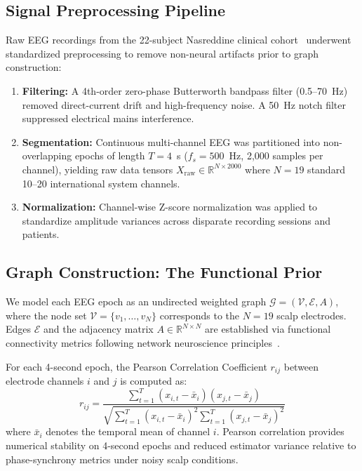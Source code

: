 \documentclass[journal]{IEEEtran}
\begin{document}
\subsection{Signal Preprocessing Pipeline}
Raw EEG recordings from the 22-subject Nasreddine clinical cohort~\cite{nasreddine} underwent standardized preprocessing to remove non-neural artifacts prior to graph construction:
\begin{enumerate}
    \item \textbf{Filtering:} A 4th-order zero-phase Butterworth bandpass filter (0.5--70~Hz) removed direct-current drift and high-frequency noise. A 50~Hz notch filter suppressed electrical mains interference.
    \item \textbf{Segmentation:} Continuous multi-channel EEG was partitioned into non-overlapping epochs of length $T = 4$~s ($f_s = 500$~Hz, 2,000 samples per channel), yielding raw data tensors $X_{\text{raw}} \in \mathbb{R}^{N \times 2000}$ where $N = 19$ standard 10--20 international system channels.
    \item \textbf{Normalization:} Channel-wise Z-score normalization was applied to standardize amplitude variances across disparate recording sessions and patients.
\end{enumerate}

\subsection{Graph Construction: The Functional Prior}
We model each EEG epoch as an undirected weighted graph $\mathcal{G} = (\mathcal{V}, \mathcal{E}, A)$, where the node set $\mathcal{V} = \{v_1, \dots, v_N\}$ corresponds to the $N = 19$ scalp electrodes. Edges $\mathcal{E}$ and the adjacency matrix $A \in \mathbb{R}^{N \times N}$ are established via functional connectivity metrics following network neuroscience principles~\cite{bassett, bartolomei}.

For each 4-second epoch, the Pearson Correlation Coefficient $r_{ij}$ between electrode channels $i$ and $j$ is computed as:
\begin{equation}
r_{ij} = \frac{\sum_{t=1}^T (x_{i,t} - \bar{x}_i)(x_{j,t} - \bar{x}_j)}{\sqrt{\sum_{t=1}^T (x_{i,t} - \bar{x}_i)^2 \sum_{t=1}^T (x_{j,t} - \bar{x}_j)^2}}
\end{equation}
where $\bar{x}_i$ denotes the temporal mean of channel $i$. Pearson correlation provides numerical stability on 4-second epochs and reduced estimator variance relative to phase-synchrony metrics under noisy scalp conditions.
\end{document}
